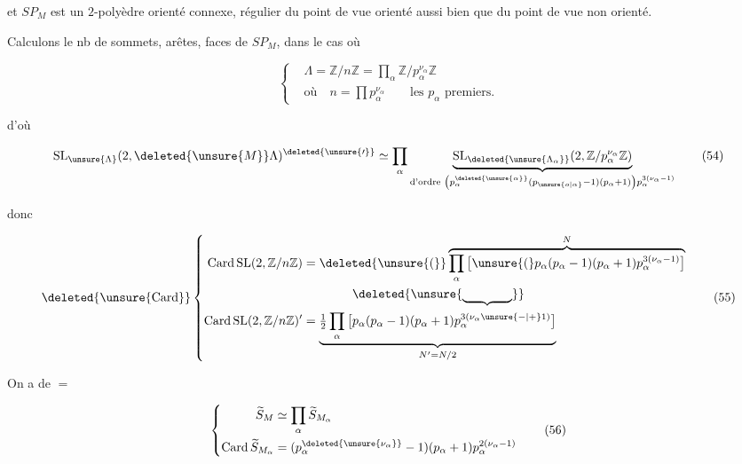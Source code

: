 \noindent\vrule\hspace{.5em}\parbox{.92\linewidth}{et $SP_M$ est un $2$-polyèdre  orienté connexe, régulier du point de vue orienté aussi bien que du point de vue non orienté.}

Calculons le nb de sommets, arêtes, faces de $SP_M$, dans le cas où

\[
\left\{\begin{aligned}
&\Lambda=\mathbb{Z}/n\mathbb{Z}=\prod_{\alpha}\mathbb{Z}/p_\alpha^{\nu_\alpha}\mathbb{Z}\\
&\text{où}\quad n=\prod p_\alpha^{\nu_\alpha}\qquad\text{les }p_\alpha\text{ premiers.}
\end{aligned}\right.\tag*{(53)}
\]

d'où


\[
\mathrm{SL}_{\unsure{\Lambda}}(2,\deleted{\unsure{M}}\Lambda)^{\deleted{\unsure{\prime}}}
\simeq\prod_\alpha\underbrace{\mathrm{SL}_{\deleted{\unsure{\Lambda_\alpha}}}(2,\mathbb{Z}/p_\alpha^{\nu_\alpha}\mathbb{Z})}_{\text{d'ordre }\left(p_\alpha^{\deleted{\unsure{\alpha}}}(p_{\unsure{o|\alpha}}-1)(p_\alpha+1)\right)p_\alpha^{3(\nu_\alpha-1)}}\tag*{(54)}
\]

donc

\[
\deleted{\unsure{\operatorname{Card}}}
\left\{\begin{aligned}
\operatorname{Card}\mathrm{SL}(2,\mathbb{Z}/n\mathbb{Z})&=\deleted{\unsure{(}}\overbrace{\prod_{\alpha}\big[\unsure{(}p_\alpha(p_\alpha-1)(p_\alpha+1)p_\alpha^{3(\nu_\alpha-1)}\big]}^N\\
&\hspace{4em}\deleted{\unsure{\underbrace{\hspace{4em}}}}\\
\operatorname{Card}\mathrm{SL}(2,\mathbb{Z}/n\mathbb{Z})'&=\underbrace{\tfrac12\prod_{\alpha}\big[p_\alpha(p_\alpha-1)(p_\alpha+1)p_\alpha^{3(\nu_\alpha\unsure{-|+}1)}\big]}_{N'=N/2}
\end{aligned}\right.\tag*{(55)}
\]

 On a de $=$

\[
\left\{\begin{aligned}
\widetilde S_M&\simeq\prod_\alpha\widetilde S_{M_\alpha}\\
\operatorname{Card}\widetilde S_{M_\alpha}&=(p_\alpha^{\deleted{\unsure{\nu_\alpha}}}-1)(p_\alpha+1)p_\alpha^{2(\nu_\alpha-1)}
\end{aligned}\right.\tag*{(56)}
\]

